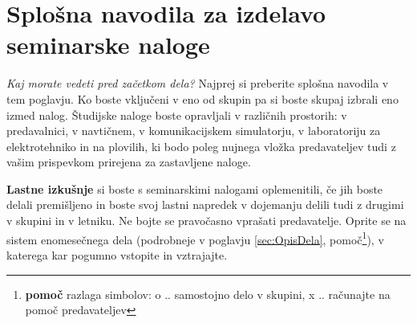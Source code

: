 %
\chapter{Splošna navodila za izdelavo seminarske naloge }
\label{ch:NavodSeminar}

\textit{Kaj morate vedeti pred začetkom dela?} Najprej si preberite splošna navodila v tem poglavju. Ko boste vključeni v eno od skupin pa si boste skupaj izbrali eno izmed nalog. Študijske naloge boste opravljali v različnih prostorih: v predavalnici, v navtičnem, v komunikacijskem simulatorju, v laboratoriju za elektrotehniko in na plovilih, ki bodo poleg nujnega vložka predavateljev tudi z vašim prispevkom prirejena za zastavljene naloge.

\textbf{Lastne izkušnje} si boste s seminarskimi nalogami oplemenitili, če jih boste delali premišljeno in boste svoj lastni napredek v dojemanju delili tudi z drugimi v skupini in v letniku. Ne bojte se pravočasno vprašati predavatelje. Oprite se na sistem enomesečnega dela (podrobneje v poglavju \ref{sec:OpisDela}, pomoč\footnote{\textbf{pomoč} razlaga simbolov: o .. samostojno delo v skupini, x .. računajte na pomoč predavateljev}), v katerega kar pogumno vstopite in vztrajajte.
 
